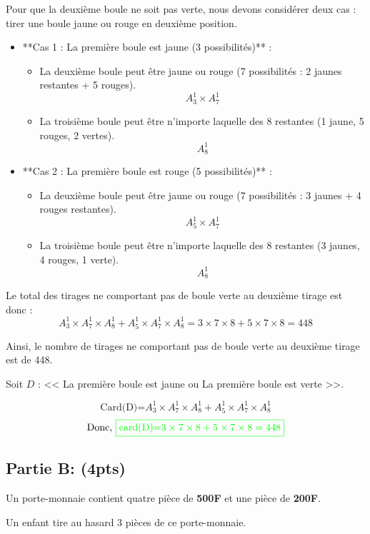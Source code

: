 \documentclass[12pt]{article}
\begin{document}
Pour que la deuxième boule ne soit pas verte, nous devons considérer deux cas : tirer une boule jaune ou rouge en deuxième position.
\begin{itemize}
\item **Cas 1 : La première boule est jaune (3 possibilités)** :
	\begin{itemize}
  	\item La deuxième boule peut être jaune ou rouge (7 possibilités : 2 jaunes restantes + 5 rouges).
  	\[
		A_{3}^{1}\times A_{7}^{1}
	\]
  	\item La troisième boule peut être n'importe laquelle des 8 restantes (1 jaune, 5 rouges, 2 vertes).
	 \[
		A_{8}^{1}
	\]
	\end{itemize}
\item **Cas 2 : La première boule est rouge (5 possibilités)** :
	\begin{itemize}
 	 	\item La deuxième boule peut être jaune ou rouge (7 possibilités : 3 jaunes + 4 rouges restantes).
 	 	 \[
			A_{5}^{1}\times A_{7}^{1}
		\]
  		\item La troisième boule peut être n'importe laquelle des 8 restantes (3 jaunes, 4 rouges, 1 verte).
  		\[
			A_{8}^{1}
		\]
\end{itemize}
\end{itemize}
Le total des tirages ne comportant pas de boule verte au deuxième tirage est donc :
\[
A_{3}^{1}\times A_{7}^{1}\times A_{8}^{1} + A_{5}^{1}\times A_{7}^{1} \times A_{8}^{1}=3 \times 7 \times 8 + 5 \times 7 \times 8 = 448
\]

Ainsi, le nombre de tirages ne comportant pas de boule verte au deuxième tirage est de 448.

\textbf{\color{green}{Autrement dit :}}

Soit $D$ : << La première boule est jaune ou La première boule est verte >>.

\[\text{Card(D)=}
A_{3}^{1}\times A_{7}^{1}\times A_{8}^{1} + A_{5}^{1}\times A_{7}^{1} \times A_{8}^{1}
\]
\[\text{Donc, }\color{green}{\boxed{\text{card(D)=}3 \times 7 \times 8 + 5 \times 7 \times 8 = 448}}\]
\subsection*{Partie B: (4pts)}
Un porte-monnaie contient quatre pièce de \textbf{500F} et une pièce de \textbf{200F}.

Un enfant tire au hasard 3 pièces de ce porte-monnaie.
\end{document}
